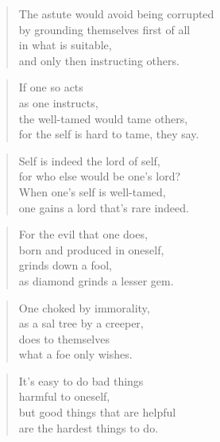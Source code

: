 \documentclass[12pt,openany]{book}%
\begin{document}
\begin{verse}%
The astute would avoid being corrupted \\
by grounding themselves first of all \\
in what is suitable, \\
and only then instructing others. 

%
\end{verse}

\begin{verse}%
If one so acts \\
as one instructs, \\
the well-tamed would tame others, \\
for the self is hard to tame, they say. 

%
\end{verse}

\begin{verse}%
Self is indeed the lord of self, \\
for who else would be one’s lord? \\
When one’s self is well-tamed, \\
one gains a lord that’s rare indeed. 

%
\end{verse}

\begin{verse}%
For the evil that one does, \\
born and produced in oneself, \\
grinds down a fool, \\
as diamond grinds a lesser gem. 

%
\end{verse}

\begin{verse}%
One choked by immorality, \\
as a sal tree by a creeper, \\
does to themselves \\
what a foe only wishes. 

%
\end{verse}

\begin{verse}%
It’s easy to do bad things \\
harmful to oneself, \\
but good things that are helpful \\
are the hardest things to do. 

%
\end{verse}
\end{document}
